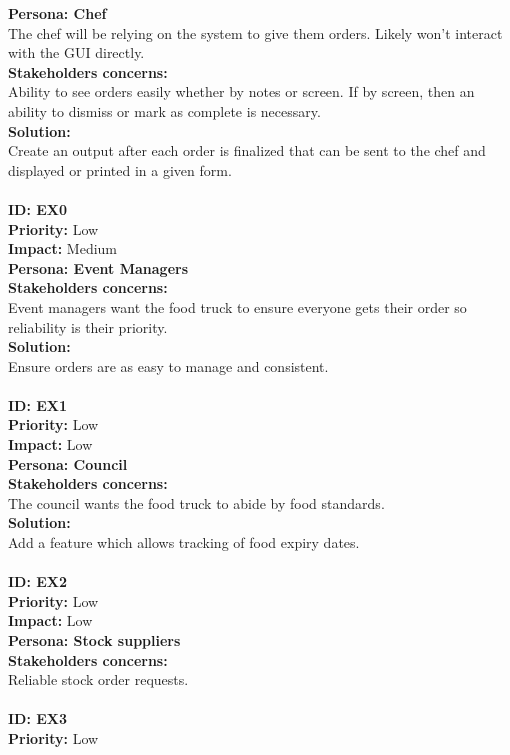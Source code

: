 \textbf{Persona: Chef\\}
The chef will be relying on the system to give them orders. Likely won’t interact with the GUI directly.\\
\textbf{Stakeholders concerns:\\}
Ability to see orders easily whether by notes or screen. If by screen, then an ability to dismiss or mark as complete is necessary.\\
\textbf{Solution:\\}
Create an output after each order is finalized that can be sent to the chef and displayed or printed in a given form.\\
\\
\textbf{ID: EX0}\\
\textbf{Priority:} Low\\
\textbf{Impact:} Medium\\
\textbf{Persona: Event Managers\\}
\textbf{Stakeholders concerns:\\}
Event managers want the food truck to ensure everyone gets their order so reliability is their priority.\\
\textbf{Solution:\\}
Ensure orders are as easy to manage and consistent.\\
\\
\textbf{ID: EX1}\\
\textbf{Priority:} Low\\
\textbf{Impact:} Low\\
\textbf{Persona: Council\\}
\textbf{Stakeholders concerns:\\}
The council wants the food truck to abide by food standards.\\
\textbf{Solution:\\}
Add a feature which allows tracking of food expiry dates.\\
\\
\textbf{ID: EX2}\\
\textbf{Priority:} Low\\
\textbf{Impact:} Low\\
\textbf{Persona: Stock suppliers\\}
\textbf{Stakeholders concerns:\\}
Reliable stock order requests.\\
\\
\textbf{ID: EX3}\\
\textbf{Priority:} Low\\
